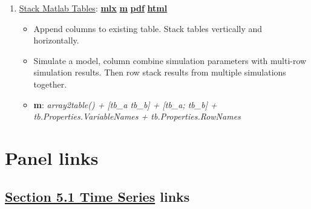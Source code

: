 \documentclass[
]{book}
\providecommand{\tightlist}{%
  \setlength{\itemsep}{0pt}\setlength{\parskip}{0pt}}
\begin{document}
\begin{enumerate}
\def\labelenumi{\arabic{enumi}.}
\tightlist
\item
  \href{https://fanwangecon.github.io/M4Econ/table/join/htmlpdfm/fs_tab_stack.html}{Stack Matlab Tables}: \href{https://github.com/FanWangEcon/M4Econ/blob/master/table/join/fs_tab_stack.mlx}{\textbf{mlx}} \textbar{} \href{https://github.com/FanWangEcon/M4Econ/blob/master/table/join/htmlpdfm/fs_tab_stack.m}{\textbf{m}} \textbar{} \href{https://github.com/FanWangEcon/M4Econ/blob/master/table/join/htmlpdfm/fs_tab_stack.pdf}{\textbf{pdf}} \textbar{} \href{https://fanwangecon.github.io/M4Econ/table/join/htmlpdfm/fs_tab_stack.html}{\textbf{html}}

  \begin{itemize}
  \tightlist
  \item
    Append columns to existing table. Stack tables vertically and horizontally.
  \item
    Simulate a model, column combine simulation parameters with multi-row simulation results. Then row stack results from multiple simulations together.
  \item
    \textbf{m}: \emph{array2table() + {[}tb\_a tb\_b{]} + {[}tb\_a; tb\_b{]} + tb.Properties.VariableNames + tb.Properties.RowNames}
  \end{itemize}
\end{enumerate}

\hypertarget{panel-links}{%
\section{Panel links}\label{panel-links}}

\hypertarget{section-5.1-time-seriestime-series-links}{%
\subsection{\texorpdfstring{\protect\hyperlink{time-series}{Section 5.1 Time Series} links}{Section 5.1 Time Series links}}\label{section-5.1-time-seriestime-series-links}}
\end{document}

